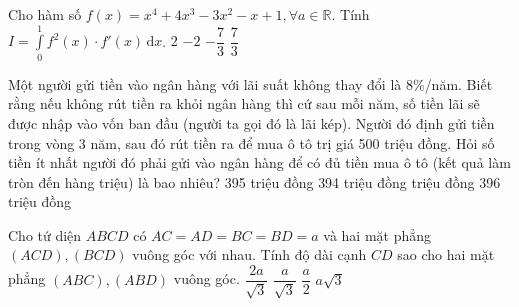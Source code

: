 \begin{ex}%
	Cho hàm số $f(x)=x^4+4x^3-3x^2-x+1, \forall a \in \mathbb{R}$. Tính $I=\displaystyle\int\limits_0^1 f^2(x)\cdot f'(x)\mathrm{\,d}x$.
	\choice
	{$2$}
	{$-2$}
	{$-\dfrac{7}{3}$}
	{\True $\dfrac{7}{3}$}
\end{ex}
\begin{ex}%
		Một người gửi tiền vào ngân hàng với lãi suất không thay đổi là $8\%$/năm. Biết rằng nếu không rút tiền ra khỏi ngân hàng thì cứ sau mỗi năm, số tiền lãi sẽ được nhập vào vốn ban đầu (người ta gọi đó là lãi kép). Người đó định gửi tiền trong vòng 3 năm, sau đó rút tiền ra để mua ô tô trị giá 500 triệu đồng. Hỏi số tiền ít nhất người đó phải gửi vào ngân hàng để có đủ tiền mua ô tô (kết quả làm tròn đến hàng triệu) là bao nhiêu?
	\choice
	{395 triệu đồng}
	{394 triệu đồng}
	{ triệu đồng}
	{396 triệu đồng}
	\end{ex}
\begin{ex}%
	Cho tứ diện $ABCD$ có $AC=AD=BC=BD=a$ và hai mặt phẳng $(ACD), (BCD)$ vuông góc với nhau. Tính độ dài cạnh $CD$ sao cho hai mặt phẳng $(ABC), (ABD)$ vuông góc.
	\choice
	{\True $\dfrac{2a}{\sqrt{3}}$}
	{$\dfrac{a}{\sqrt{3}}$}
	{$\dfrac{a}{2}$}
	{$a\sqrt{3}$}
	\end{ex}
